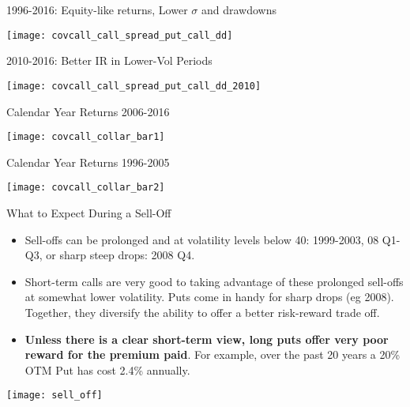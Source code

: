 \documentclass{beamer}
\begin{document}
\begin{frame}{1996-2016: Equity-like returns, Lower $\sigma$ and drawdowns}

\texttt{[image: covcall\_call\_spread\_put\_call\_dd]}

\end{frame}

\begin{frame}{2010-2016: Better IR in Lower-Vol Periods}

\texttt{[image: covcall\_call\_spread\_put\_call\_dd\_2010]}

\end{frame}

\begin{frame}{Calendar Year Returns 2006-2016}

\texttt{[image: covcall\_collar\_bar1]}

\end{frame}


\begin{frame}{Calendar Year Returns 1996-2005}

\texttt{[image: covcall\_collar\_bar2]}

\end{frame}


\begin{frame}{What to Expect During a Sell-Off}
\fontsize{6pt}{7.2}\selectfont
\begin{block}{}
\begin{itemize}

\item Sell-offs can be prolonged and at volatility levels below 40: 1999-2003, 08 Q1-Q3, or sharp steep drops: 2008 Q4. 
\item Short-term calls are very good to taking advantage of these prolonged sell-offs at somewhat lower volatility. Puts come in handy for sharp drops (eg 2008). Together, they diversify the ability to offer a better risk-reward trade off.
\item \textbf{Unless there is a clear short-term view, long puts offer very poor reward for the premium paid}. For example, over the past 20 years a 20\% OTM Put has cost 2.4\% annually. %

\end{itemize}

\end{block}

\texttt{[image: sell\_off]}
\end{frame}
\end{document}
